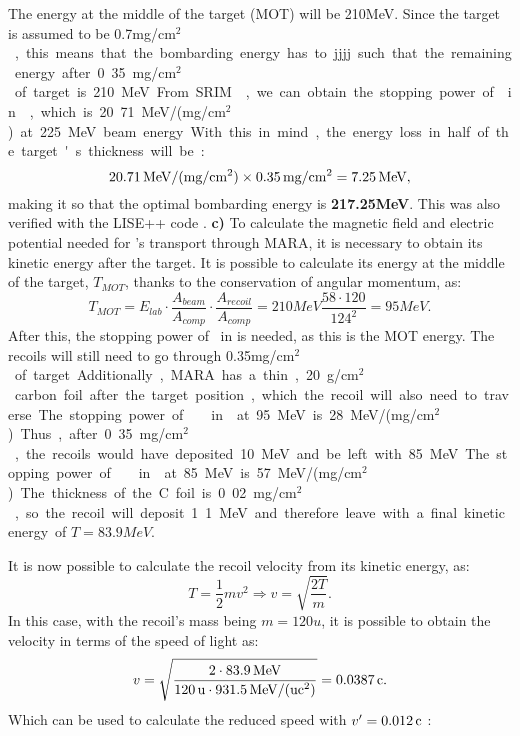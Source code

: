 The energy at the middle of the target (MOT) will be 210\unit{MeV}. Since the target is assumed to be 0.7\unit{mg/cm$^2$}, this means that the bombarding energy has to jjjj such that the remaining energy after 0.35\unit{mg/cm$^2$} of target is 210\unit{MeV}. From SRIM \cite{srim}, we can obtain the stopping power of  in , which is 20.71\unit{MeV/(mg/cm$^2$)} at 225\unit{MeV} beam energy. With this in mind, the energy loss in half of the target's thickness will be: $$20.71\,\text{MeV/(mg/cm$^2$)}\times0.35\,\text{mg/cm$^2$} = 7.25\,\text{MeV},$$ making it so that the optimal bombarding energy is \textbf{217.25\unit{MeV}}. This was also verified with the LISE++ code \cite{lise}.
\newpage
\textbf{c)} To calculate the magnetic field and electric potential needed for \la's transport through MARA, it is necessary to obtain its kinetic energy after the target. It is possible to calculate its energy at the middle of the target, $T_{MOT}$, thanks to the conservation of angular momentum, as:
\begin{equation}
    \label{MOT}
    T_{MOT} = E_{lab}\cdot\frac{A_{beam}}{A_{comp}}\cdot\frac{A_{recoil}}{A_{comp}} = 210\unit{MeV}\frac{58\cdot 120}{124^2} = 95\unit{MeV}.
\end{equation}
After this, the stopping power of \la\ in  is needed, as this is the MOT energy. The recoils will still need to go through 0.35\unit{mg/cm$^2$} of target. Additionally, MARA has a thin, 20\unit{\textmu g/cm$^{2}$} carbon foil after the target position, which the recoil will also need to traverse. 

The stopping power of \la\ in  at 95\unit{MeV} is 28\unit{MeV/(mg/cm$^2$)}. Thus, after 0.35\unit{mg/cm$^2$}, the recoils would have deposited 10\unit{MeV} and be left with 85\unit{MeV}.

The stopping power of \la\ in  at 85\unit{MeV} is 57\unit{MeV/(mg/cm$^2$)}. The thickness of the C foil is 0.02\unit{mg/cm$^2$}, so the recoil will deposit 1.1\unit{MeV} and therefore leave with a final kinetic energy of $T = 83.9\unit{MeV}$.

It is now possible to calculate the recoil velocity from its kinetic energy, as: 
\begin{equation}
    \label{eq:velocity}
    T = \frac{1}{2}mv^2 \Longrightarrow v = \sqrt{\frac{2T}{m}}.
\end{equation}
In this case, with the recoil's mass being $m = 120\unit{u}$, it is possible to obtain the velocity in terms of the speed of light as:
\begin{equation}
    \label{eq:vel_number}
    v = \sqrt{\frac{2\cdot83.9\,\text{MeV}}{120\,\text{u}\cdot931.5\,\text{MeV/(uc$^2$)}}} = 0.0387\,\text{c}.   
\end{equation}
Which can be used to calculate the reduced speed with $v' = 0.012\,\text{c}$ \cite{ND}:


